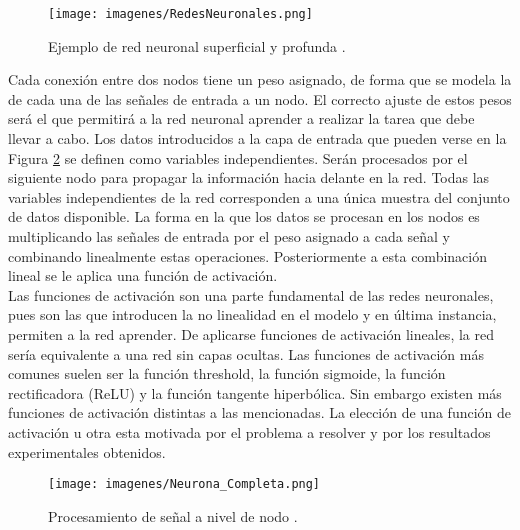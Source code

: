 \begin{figure}[ht!]
    \centering
    \texttt{[image: imagenes/RedesNeuronales.png]}
    \caption[Ejemplo de red neuronal superficial y profunda.]{Ejemplo de red neuronal superficial y profunda \cite{garcía_iñareta_j_o_2020}.}
    \label{fig:redesneuronales}
\end{figure}

Cada conexión entre dos nodos tiene un peso asignado, de forma que se modela la  de cada una de las señales de entrada a un nodo. El correcto ajuste de estos pesos será el que permitirá a la red neuronal aprender a realizar la tarea que debe llevar a cabo. Los datos introducidos a la capa de entrada que pueden verse en la Figura \ref{fig:neurona} se definen como variables independientes. Serán procesados por el siguiente nodo para propagar la información hacia delante en la red. Todas las variables independientes de la red corresponden a una única muestra del conjunto de datos disponible. La forma en la que los datos se procesan en los nodos es multiplicando las señales de entrada por el peso asignado a cada señal y combinando linealmente estas operaciones. Posteriormente a esta combinación lineal se le aplica una función de activación.\\

Las funciones de activación son una parte fundamental de las redes neuronales, pues son las que introducen la no linealidad en el modelo y en última instancia, permiten a la red aprender. De aplicarse funciones de activación lineales, la red sería equivalente a una red sin capas ocultas. Las funciones de activación más comunes suelen ser la función threshold, la función sigmoide, la función rectificadora (ReLU) y la función tangente hiperbólica. Sin embargo existen más funciones de activación distintas a las mencionadas. La elección de una función de activación u otra esta motivada por el problema a resolver y por los resultados experimentales obtenidos.

\begin{figure}[ht!]
    \centering
    \texttt{[image: imagenes/Neurona\_Completa.png]}
    \caption[Procesamiento de señal a nivel de nodo.]{Procesamiento de señal a nivel de nodo \cite{garcía_iñareta_j_o_2020}.}
    \label{fig:neurona}
\end{figure}

